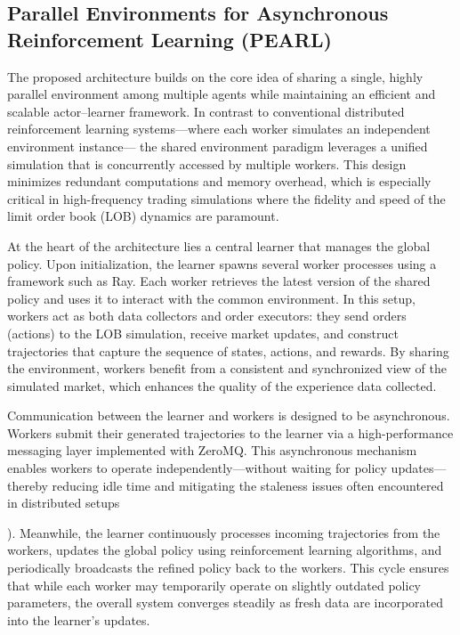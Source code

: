 \subsection{Parallel Environments for Asynchronous Reinforcement Learning (PEARL)}

The proposed architecture builds on the core idea of sharing a single, highly parallel environment among multiple agents while
maintaining an efficient and scalable actor–learner framework.
In contrast to conventional distributed reinforcement learning systems—where each worker simulates an independent environment instance—
the shared environment paradigm leverages a unified simulation that is concurrently accessed by multiple workers.
This design minimizes redundant computations and memory overhead,
which is especially critical in high-frequency trading simulations where the fidelity and speed of the limit order book (LOB) dynamics are paramount.

At the heart of the architecture lies a central learner that manages the global policy.
Upon initialization, the learner spawns several worker processes using a framework such as Ray.
Each worker retrieves the latest version of the shared policy and uses it to interact with the common environment.
In this setup, workers act as both data collectors and order executors: they send orders (actions) to the LOB simulation,
receive market updates, and construct trajectories that capture the sequence of states, actions, and rewards.
By sharing the environment, workers benefit from a consistent and synchronized view of the simulated market,
which enhances the quality of the experience data collected.

Communication between the learner and workers is designed to be asynchronous.
Workers submit their generated trajectories to the learner via a high-performance messaging layer implemented with ZeroMQ.
This asynchronous mechanism enables workers to operate independently—without waiting for policy updates—
thereby reducing idle time and mitigating the staleness issues often encountered in distributed setups

). Meanwhile, the learner continuously processes incoming trajectories from the workers, updates the global policy using reinforcement learning algorithms,
and periodically broadcasts the refined policy back to the workers.
This cycle ensures that while each worker may temporarily operate on slightly outdated policy parameters,
the overall system converges steadily as fresh data are incorporated into the learner's updates.

